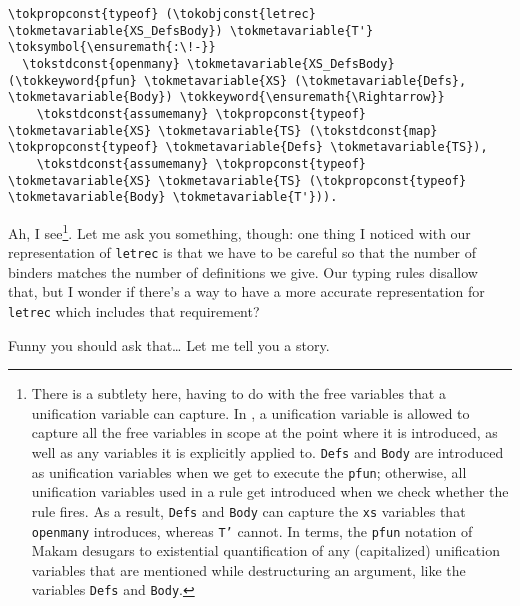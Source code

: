 \importantCodeblock{}

\begin{verbatim}
\tokpropconst{typeof} (\tokobjconst{letrec} \tokmetavariable{XS_DefsBody}) \tokmetavariable{T'} \toksymbol{\ensuremath{:\!-}}
  \tokstdconst{openmany} \tokmetavariable{XS_DefsBody} (\tokkeyword{pfun} \tokmetavariable{XS} (\tokmetavariable{Defs}, \tokmetavariable{Body}) \tokkeyword{\ensuremath{\Rightarrow}}
    \tokstdconst{assumemany} \tokpropconst{typeof} \tokmetavariable{XS} \tokmetavariable{TS} (\tokstdconst{map} \tokpropconst{typeof} \tokmetavariable{Defs} \tokmetavariable{TS}),
    \tokstdconst{assumemany} \tokpropconst{typeof} \tokmetavariable{XS} \tokmetavariable{TS} (\tokpropconst{typeof} \tokmetavariable{Body} \tokmetavariable{T'})).
\end{verbatim}

\importantCodeblockEnd{}

\heroSTUDENT{} Ah, I
see\footnote{There is a subtlety here, having to do with the free variables that a unification variable
can capture. In \lamprolog, a unification variable is allowed to capture all the free variables in scope at the
point where it is introduced, as well as any variables it is explicitly applied to. \texttt{Defs} and \texttt{Body} are introduced as unification variables when we get to execute the \texttt{pfun}; otherwise, all unification variables used in a rule get introduced when we check whether the rule fires. As a result, \texttt{Defs} and \texttt{Body} can capture the \texttt{xs} variables that \texttt{openmany} introduces, whereas \texttt{T'} cannot. In \lamprolog terms, the \texttt{pfun} notation of Makam desugars to existential quantification of any (capitalized) unification variables that are mentioned while destructuring an argument, like the variables \texttt{Defs} and \texttt{Body}.}.
Let me ask you something, though: one thing I noticed with our
representation of \texttt{letrec} is that we have to be careful so that
the number of binders matches the number of definitions we give. Our
typing rules disallow that, but I wonder if there's a way to have a more
accurate representation for \texttt{letrec} which includes that
requirement?

\heroADVISOR{} Funny you should ask that\ldots{} Let me tell you a story.
